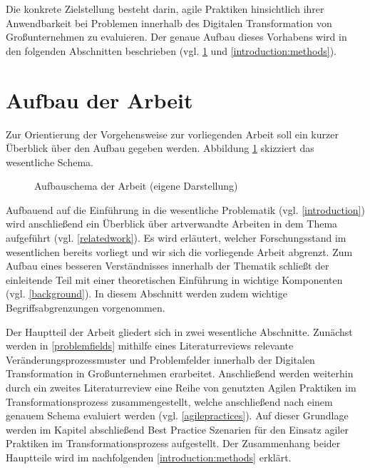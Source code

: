 Die konkrete Zielstellung besteht darin, agile Praktiken hinsichtlich ihrer Anwendbarkeit bei Problemen innerhalb des Digitalen Transformation von Großunternehmen zu evaluieren. Der genaue Aufbau dieses Vorhabens wird in den folgenden Abschnitten beschrieben (vgl. \ref{introduction:schema} und \ref{introduction:methods}).

\section{Aufbau der Arbeit}
\label{introduction:schema}

Zur Orientierung der Vorgehensweise zur vorliegenden Arbeit soll ein kurzer Überblick über den Aufbau gegeben werden. Abbildung \ref{fig:aufbau} skizziert das wesentliche Schema.

\begin{figure}
	\centering
	\caption[Aufbauschema der Arbeit]{Aufbauschema der Arbeit (eigene Darstellung)}
	\label{fig:aufbau}
\end{figure}

Aufbauend auf die Einführung in die wesentliche Problematik  (vgl. \ref{introduction}) wird anschließend ein Überblick über artverwandte Arbeiten in dem Thema aufgeführt (vgl. \ref{relatedwork}). Es wird erläutert, welcher Forschungsstand im wesentlichen bereits vorliegt und wir sich die vorliegende Arbeit abgrenzt. Zum Aufbau eines besseren Verständnisses innerhalb der Thematik schließt der einleitende Teil mit einer theoretischen Einführung in wichtige Komponenten (vgl. \ref{background}). In diesem Abschnitt werden zudem wichtige Begriffsabgrenzungen vorgenommen.

Der Hauptteil der Arbeit gliedert sich in zwei wesentliche Abschnitte. Zunächst werden in \ref{problemfields} mithilfe eines Literaturreviews relevante Veränderungsprozessmuster und Problemfelder innerhalb der Digitalen Transformation in Großunternehmen erarbeitet. Anschließend werden weiterhin durch ein zweites Literaturreview eine Reihe von genutzten Agilen Praktiken im Transformationsprozess zusammengestellt, welche anschließend nach einem genauem Schema evaluiert werden (vgl. \ref{agilepractices}). Auf dieser Grundlage werden im Kapitel abschließend Best Practice Szenarien für den Einsatz agiler Praktiken im Transformationsprozess aufgestellt. Der Zusammenhang beider Hauptteile wird im nachfolgenden \ref{introduction:methods} erklärt.

